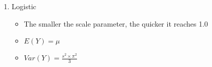 \documentclass[tiles]{cornellnotes}
\begin{document}
\begin{cuenotes}
{\begin{enumerate}
\begin{itemize}
                                        \item $E(Y) = \frac{1}{\lambda}$
                                        \item $Var(Y) = \frac{1}{\lambda^2}$
                                \end{itemize}
                                \item Logistic
                                \begin{itemize}
                                        \item The smaller the scale parameter, the quicker it reaches 1.0
                                        \item $E(Y) = \mu$
                                        \item $Var(Y) = \frac{s^2 \times \pi^2}{3}$
                                \end{itemize}
                        \end{enumerate}
                }
        \end{cuenotes}
\end{document}
